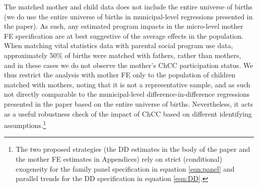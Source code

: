 \documentclass[12pt]{article}
\begin{document}
\begin{spacing}{1.4}
The matched mother and child data does not include the entire
universe of births (we do use the entire universe of births in
municipal-level regressions presented in the paper).  As such,
any estimated program impacts in the micro-level mother FE
specification are at best suggestive of the average effects in
the population.  When matching vital statistics data with
parental social program use data, approximately 50\% of births
were matched with fathers, rather than mothers, and in these
cases we do not observe the mother's ChCC participation status.
We thus restrict the analysis with mother FE only to the
population of children matched with mothers, noting that it is
not a representative sample, and as such not directly comparable
to the municipal-level difference-in-difference regressions
presented in the paper based on the entire universe of births.
Nevertheless, it acts as a useful robustness check of the impact
of ChCC based on different identifying assumptions.\footnote{The
  two proposed strategies (the DD estimates in the body of the
  paper and the mother FE estimates in Appendices) rely on strict
  (conditional) exogeneity for the family panel specification in
  equation \ref{eqn:panel} and parallel trends for the DD
  specification in equation \ref{eqn:DD}.}
%


\end{spacing}
\end{document}
